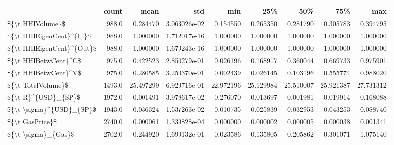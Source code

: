 \begin{tabular}{lrrrrrrrr}
\toprule
{} &   count &       mean &           std &        min &        25\% &        50\% &        75\% &        max \\
\midrule
\$\{\textbackslash t HHIVolume\}\$          &   988.0 &   0.284470 &  3.063026e-02 &   0.154550 &   0.265350 &   0.281790 &   0.305783 &   0.394795 \\
\$\{\textbackslash t HHIEigenCent\}\textasciicircum \{In\}\$  &   988.0 &   1.000000 &  1.712017e-16 &   1.000000 &   1.000000 &   1.000000 &   1.000000 &   1.000000 \\
\$\{\textbackslash t HHIEigenCent\}\textasciicircum \{Out\}\$ &   988.0 &   1.000000 &  1.679243e-16 &   1.000000 &   1.000000 &   1.000000 &   1.000000 &   1.000000 \\
\$\{\textbackslash t HHIBetwCent\}\textasciicircum C\$      &   975.0 &   0.422523 &  2.850279e-01 &   0.026196 &   0.168917 &   0.360044 &   0.669733 &   0.975901 \\
\$\{\textbackslash t HHIBetwCent\}\textasciicircum V\$      &   975.0 &   0.280585 &  3.256370e-01 &   0.002439 &   0.026145 &   0.103196 &   0.555774 &   0.988020 \\
\$\{\textbackslash t TotalVolume\}\$        &  1493.0 &  25.497299 &  6.929716e-01 &  22.972196 &  25.129984 &  25.510007 &  25.921387 &  27.731312 \\
\$\{\textbackslash t R\}\textasciicircum \{USD\}\_\{SP\}\$       &  1972.0 &   0.001491 &  3.978617e-02 &  -0.276070 &  -0.013697 &   0.001981 &   0.019914 &   0.168088 \\
\$\{\textbackslash t \textbackslash sigma\}\textasciicircum \{USD\}\_\{SP\}\$  &  1943.0 &   0.036324 &  1.537263e-02 &   0.010735 &   0.025839 &   0.032953 &   0.043253 &   0.088740 \\
\$\{\textbackslash t GasPrice\}\$           &  2740.0 &   0.000061 &  1.339828e-04 &   0.000000 &   0.000002 &   0.000005 &   0.000038 &   0.001341 \\
\$\{\textbackslash t \textbackslash sigma\}\_\{Gas\}\$       &  2702.0 &   0.244920 &  1.699132e-01 &   0.023586 &   0.135805 &   0.205862 &   0.301071 &   1.075140 \\
\bottomrule
\end{tabular}
